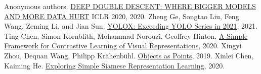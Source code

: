 \documentclass[a4j]{ujarticle}
\begin{document}
    \begin{thebibliography}{9}
         Anonymous authors. \href{https://openreview.net/attachment?id=B1g5sA4twr&name=original_pdf}{DEEP DOUBLE DESCENT: WHERE BIGGER MODELS AND MORE DATA HURT} ICLR 2020, 2020.
         Zheng Ge, Songtao Liu, Feng Wang, Zeming Li, and Jian Sun. \href{https://arxiv.org/pdf/2107.08430.pdf}{YOLOX: Exceeding YOLO Series in 2021}, 2021.
         Ting Chen, Simon Kornblith, Mohammad Norouzi, Geoffrey Hinton. \href{https://arxiv.org/pdf/2002.05709.pdf}{A Simple Framework for Contrastive Learning of Visual Representations}, 2020.
         Xingyi Zhou, Dequan Wang, Philipp Krähenbühl.
        \href{https://arxiv.org/pdf/1904.07850.pdf}{Objects as Points}, 2019.
         Xinlei Chen, Kaiming He. \href{https://arxiv.org/pdf/2011.10566.pdf}{Exploring Simple Siamese Representation Learning}, 2020.
    \end{thebibliography}
\end{document}

